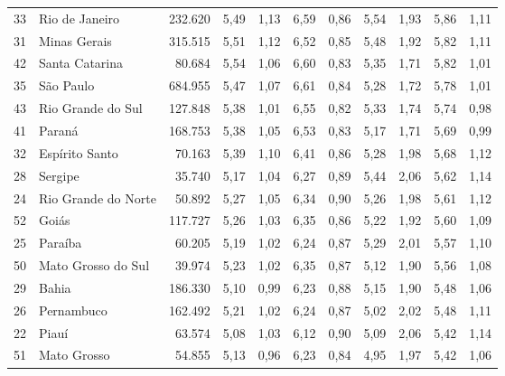 \begin{table}[]
{\begin{tabular}{llrrrrrrrrr}
            \rowcolor[HTML]{DCE6F1}
            33 & Rio de Janeiro      & 232.620 & 5,49 & 1,13 & 6,59 & 0,86 & 5,54 & 1,93 & 5,86 & 1,11 \\
            31 & Minas Gerais        & 315.515 & 5,51 & 1,12 & 6,52 & 0,85 & 5,48 & 1,92 & 5,82 & 1,11 \\
            \rowcolor[HTML]{DCE6F1}
            42 & Santa Catarina      & 80.684  & 5,54 & 1,06 & 6,60 & 0,83 & 5,35 & 1,71 & 5,82 & 1,01 \\
            35 & São Paulo           & 684.955 & 5,47 & 1,07 & 6,61 & 0,84 & 5,28 & 1,72 & 5,78 & 1,01 \\
            \rowcolor[HTML]{DCE6F1}
            43 & Rio Grande do Sul   & 127.848 & 5,38 & 1,01 & 6,55 & 0,82 & 5,33 & 1,74 & 5,74 & 0,98 \\
            41 & Paraná              & 168.753 & 5,38 & 1,05 & 6,53 & 0,83 & 5,17 & 1,71 & 5,69 & 0,99 \\
            \rowcolor[HTML]{DCE6F1}
            32 & Espírito Santo      & 70.163  & 5,39 & 1,10 & 6,41 & 0,86 & 5,28 & 1,98 & 5,68 & 1,12 \\
            28 & Sergipe             & 35.740  & 5,17 & 1,04 & 6,27 & 0,89 & 5,44 & 2,06 & 5,62 & 1,14 \\
            \rowcolor[HTML]{DCE6F1}
            24 & Rio Grande do Norte & 50.892  & 5,27 & 1,05 & 6,34 & 0,90 & 5,26 & 1,98 & 5,61 & 1,12 \\
            52 & Goiás               & 117.727 & 5,26 & 1,03 & 6,35 & 0,86 & 5,22 & 1,92 & 5,60 & 1,09 \\
            \rowcolor[HTML]{DCE6F1}
            25 & Paraíba             & 60.205  & 5,19 & 1,02 & 6,24 & 0,87 & 5,29 & 2,01 & 5,57 & 1,10 \\
            50 & Mato Grosso do Sul  & 39.974  & 5,23 & 1,02 & 6,35 & 0,87 & 5,12 & 1,90 & 5,56 & 1,08 \\
            \rowcolor[HTML]{DCE6F1}
            29 & Bahia               & 186.330 & 5,10 & 0,99 & 6,23 & 0,88 & 5,15 & 1,90 & 5,48 & 1,06 \\
            26 & Pernambuco          & 162.492 & 5,21 & 1,02 & 6,24 & 0,87 & 5,02 & 2,02 & 5,48 & 1,11 \\
            \rowcolor[HTML]{DCE6F1}
            22 & Piauí               & 63.574  & 5,08 & 1,03 & 6,12 & 0,90 & 5,09 & 2,06 & 5,42 & 1,14 \\
            51 & Mato Grosso         & 54.855  & 5,13 & 0,96 & 6,23 & 0,84 & 4,95 & 1,97 & 5,42 & 1,06 \\

\end{tabular}}
\end{table}

